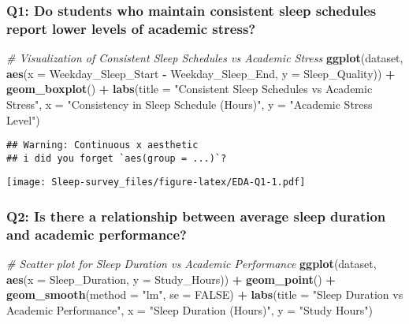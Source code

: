 \documentclass[
]{article}
\newenvironment{Shaded}{\begin{snugshade}}{\end{snugshade}}
\newcommand{\AttributeTok}[1]{\textcolor[rgb]{0.13,0.29,0.53}{#1}}
\newcommand{\CommentTok}[1]{\textcolor[rgb]{0.56,0.35,0.01}{\textit{#1}}}
\newcommand{\ConstantTok}[1]{\textcolor[rgb]{0.56,0.35,0.01}{#1}}
\newcommand{\FunctionTok}[1]{\textcolor[rgb]{0.13,0.29,0.53}{\textbf{#1}}}
\newcommand{\NormalTok}[1]{#1}
\newcommand{\SpecialCharTok}[1]{\textcolor[rgb]{0.81,0.36,0.00}{\textbf{#1}}}
\newcommand{\StringTok}[1]{\textcolor[rgb]{0.31,0.60,0.02}{#1}}
\begin{document}
\subsubsection{Q1: Do students who maintain consistent sleep schedules
report lower levels of academic
stress?}\label{q1-do-students-who-maintain-consistent-sleep-schedules-report-lower-levels-of-academic-stress}

\begin{Shaded}
\begin{Highlighting}[]
\CommentTok{\# Visualization of Consistent Sleep Schedules vs Academic Stress}
\FunctionTok{ggplot}\NormalTok{(dataset, }\FunctionTok{aes}\NormalTok{(}\AttributeTok{x =}\NormalTok{ Weekday\_Sleep\_Start }\SpecialCharTok{{-}}\NormalTok{ Weekday\_Sleep\_End, }\AttributeTok{y =}\NormalTok{ Sleep\_Quality)) }\SpecialCharTok{+}
  \FunctionTok{geom\_boxplot}\NormalTok{() }\SpecialCharTok{+}
  \FunctionTok{labs}\NormalTok{(}\AttributeTok{title =} \StringTok{"Consistent Sleep Schedules vs Academic Stress"}\NormalTok{,}
       \AttributeTok{x =} \StringTok{"Consistency in Sleep Schedule (Hours)"}\NormalTok{,}
       \AttributeTok{y =} \StringTok{"Academic Stress Level"}\NormalTok{)}
\end{Highlighting}
\end{Shaded}

\begin{verbatim}
## Warning: Continuous x aesthetic
## i did you forget `aes(group = ...)`?
\end{verbatim}

\texttt{[image: Sleep-survey\_files/figure-latex/EDA-Q1-1.pdf]}

\subsubsection{Q2: Is there a relationship between average sleep
duration and academic
performance?}\label{q2-is-there-a-relationship-between-average-sleep-duration-and-academic-performance}

\begin{Shaded}
\begin{Highlighting}[]
\CommentTok{\# Scatter plot for Sleep Duration vs Academic Performance}
\FunctionTok{ggplot}\NormalTok{(dataset, }\FunctionTok{aes}\NormalTok{(}\AttributeTok{x =}\NormalTok{ Sleep\_Duration, }\AttributeTok{y =}\NormalTok{ Study\_Hours)) }\SpecialCharTok{+}
  \FunctionTok{geom\_point}\NormalTok{() }\SpecialCharTok{+}
  \FunctionTok{geom\_smooth}\NormalTok{(}\AttributeTok{method =} \StringTok{"lm"}\NormalTok{, }\AttributeTok{se =} \ConstantTok{FALSE}\NormalTok{) }\SpecialCharTok{+}
  \FunctionTok{labs}\NormalTok{(}\AttributeTok{title =} \StringTok{"Sleep Duration vs Academic Performance"}\NormalTok{,}
       \AttributeTok{x =} \StringTok{"Sleep Duration (Hours)"}\NormalTok{,}
       \AttributeTok{y =} \StringTok{"Study Hours"}\NormalTok{)}
\end{Highlighting}
\end{Shaded}
\end{document}
